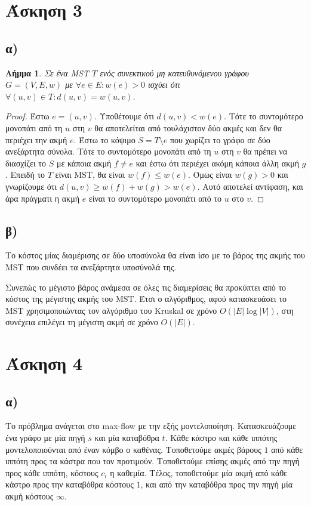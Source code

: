 \documentclass[11pt,a4paper,oneside]{report}
\newtheorem*{lemma}{Λήμμα}
\begin{document}
\section*{Άσκηση 3}
\subsection*{α)}
\begin{lemma}
Σε ένα \textlatin{MST} $T$ ενός συνεκτικού μη κατευθυνόμενου γράφου $G = (V, E, w)$ με $\forall e \in E: w(e) > 0$ ισχύει ότι $\forall (u, v) \in T: d(u, v) = w(u, v)$.
\end{lemma}
\begin{proof}
Έστω $e = (u, v)$. Υποθέτουμε ότι $d(u, v) < w(e)$. Τότε το συντομότερο μονοπάτι από τη $u$ στη $v$ θα αποτελείται από τουλάχιστον δύο ακμές και δεν θα περιέχει την ακμή $e$. Έστω το κόψιμο $S = T \setminus e$ που χωρίζει το γράφο σε δύο ανεξάρτητα σύνολα. Τότε το συντομότερο μονοπάτι από τη $u$ στη $v$ θα πρέπει να διασχίζει το $S$ με κάποια ακμή $f \neq e$ και έστω ότι περιέχει ακόμη κάποια άλλη ακμή $g$. Επειδή το $T$ είναι \textlatin{MST}, θα είναι $w(f) \leq w(e)$. Όμως είναι $w(g) > 0$ και γνωρίζουμε ότι $d(u, v) \geq w(f) + w(g) > w(e)$. Αυτό αποτελεί αντίφαση, και άρα πράγματι η ακμή $e$ είναι το συντομότερο μονοπάτι από το $u$ στο $v$. 
\end{proof}

\subsection*{β)} Το κόστος μίας διαμέρισης σε δύο υποσύνολα θα είναι ίσο με το βάρος της ακμής του \textlatin{MST} που συνδέει τα ανεξάρτητα υποσύνολά της.

Συνεπώς το μέγιστο βάρος ανάμεσα σε όλες τις διαμερίσεις θα προκύπτει από το κόστος της μέγιστης ακμής του \textlatin{MST}. Έτσι ο αλγόριθμος, αφού κατασκευάσει το \textlatin{MST} χρησιμοποιώντας τον αλγόριθμο του \textlatin{Kruskal} σε χρόνο $O( |E| \log{|V|} )$, στη συνέχεια επιλέγει τη μέγιστη ακμή σε χρόνο $O( |E| )$.

\section*{Άσκηση 4}
\subsection*{α)} Το πρόβλημα ανάγεται στο \textlatin{max-flow} με την εξής μοντελοποίηση. Κατασκευάζουμε ένα γράφο με μία πηγή $s$ και μία καταβόθρα $t$. Κάθε κάστρο και κάθε ιππότης μοντελοποιούνται από έναν κόμβο ο καθένας. Τοποθετούμε ακμές βάρους $1$ από κάθε ιππότη προς τα κάστρα που τον προτιμούν. Τοποθετούμε επίσης ακμές από την πηγή προς κάθε ιππότη, κόστους $c_i$ η καθεμία. Τέλος, τοποθετούμε μία ακμή από κάθε κάστρο προς την καταβόθρα κόστους $1$, και από την καταβόθρα προς την πηγή μία ακμή κόστους $\infty$.
\end{document}
